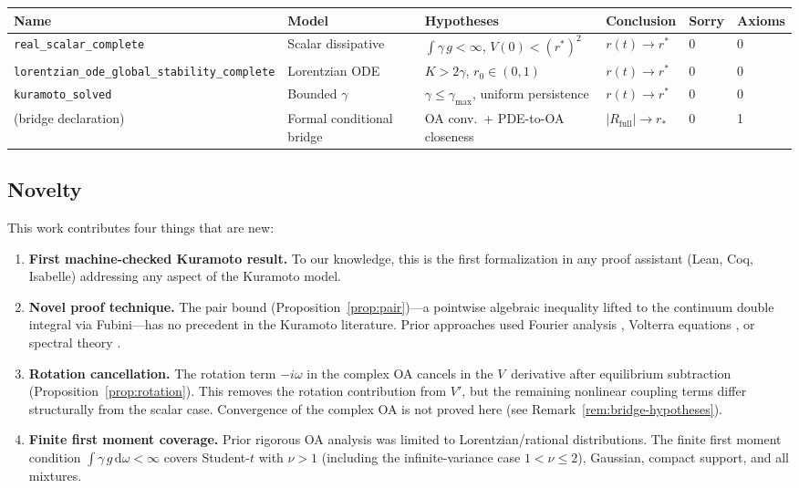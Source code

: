 \documentclass[11pt,a4paper]{article}
\theoremstyle{definition}
\begin{document}
\begin{center}
\small
\begin{tabular}{llllll}
\textbf{Name} & \textbf{Model} & \textbf{Hypotheses} & \textbf{Conclusion} & \textbf{Sorry} & \textbf{Axioms} \\
\hline
\texttt{real\_scalar\_complete} & Scalar dissipative & $\int\gamma\,g < \infty$, $V(0) < (r^*)^2$ & $r(t) \to r^*$ & 0 & 0 \\
\texttt{lorentzian\_ode\_global\_stability\_complete} & Lorentzian ODE & $K > 2\gamma$, $r_0 \in (0,1)$ & $r(t) \to r^*$ & 0 & 0 \\
\texttt{kuramoto\_solved} & Bounded $\gamma$ & $\gamma \leq \gamma_{\max}$, uniform persistence & $r(t) \to r^*$ & 0 & 0 \\
(bridge declaration) & Formal conditional bridge & OA conv.\ + PDE-to-OA closeness & $|R_{\mathrm{full}}| \to r_*$ & 0 & 1 \\
\end{tabular}
\end{center}

\subsection{Novelty}

This work contributes four things that are new:

\begin{enumerate}
\item \textbf{First machine-checked Kuramoto result.} To our knowledge, this is the first formalization in any proof assistant (Lean, Coq, Isabelle) addressing any aspect of the Kuramoto model.

\item \textbf{Novel proof technique.} The pair bound (Proposition~\ref{prop:pair})---a pointwise algebraic inequality lifted to the continuum double integral via Fubini---has no precedent in the Kuramoto literature. Prior approaches used Fourier analysis \cite{dietert2016}, Volterra equations \cite{dietert-fernandez2018}, or spectral theory \cite{chiba2015}.

\item \textbf{Rotation cancellation.} The rotation term $-i\omega$ in the complex OA cancels in the $V$~derivative after equilibrium subtraction (Proposition~\ref{prop:rotation}). This removes the rotation contribution from $V'$, but the remaining nonlinear coupling terms differ structurally from the scalar case. Convergence of the complex OA is not proved here (see Remark~\ref{rem:bridge-hypotheses}).

\item \textbf{Finite first moment coverage.} Prior rigorous OA analysis was limited to Lorentzian/rational distributions. The finite first moment condition $\int \gamma\,g\,\mathrm{d}\omega < \infty$ covers Student-$t$ with $\nu > 1$ (including the infinite-variance case $1 < \nu \leq 2$), Gaussian, compact support, and all mixtures.
\end{enumerate}
\end{document}
